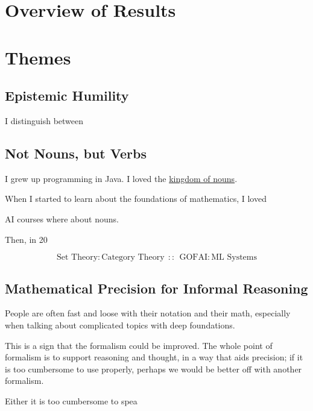 


\section{}


\section{Overview of Results}
\section{Themes}
\subsection{Epistemic Humility}
I distinguish between 

\subsection{Not Nouns, but Verbs}

I grew up programming in Java. I loved the \href{https://steve-yegge.blogspot.com/2006/03/execution-in-kingdom-of-nouns.html}{kingdom of nouns}.

When I started to learn about the foundations of mathematics, 
I loved 

AI courses where about nouns. 

Then, in 20

\[
\text{Set Theory} : \text{Category Theory}
~~::~~
\text{GOFAI} : \text{ML Systems}
\]



\subsection{Mathematical Precision for Informal Reasoning}
People are often fast and loose with their notation and their math, especially when
    talking about complicated topics with deep foundations.
    
This is a sign that the formalism could be improved.
The whole point of formalism is to support reasoning and thought, 
    in a way that aids precision; if it is too cumbersome to use properly,
    perhaps we would be better off with another formalism.
    
    Either it is too cumbersome to spea
